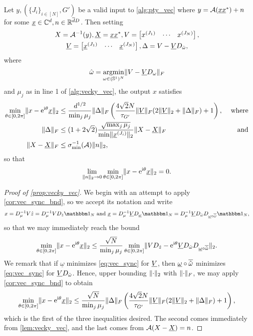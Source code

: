 \begin{proposition} \label{prop:vecky_vec}
  Let $y, (\{J_i\}_{i \in [N]}, G')$ be a valid input to \cref{alg:pty_vec} where $y = \mathcal{A}(\underline{x} \underline{x}^*) + n$ for some $\underline{x} \in \mathbb{C}^d, n \in \mathbb{R}^{\overline{d} D}$.  Then setting \[\begin{gathered}X = \mathcal{A}^{-1}(y), \underline{X} = \underline{x} \underline{x}^*, V = \begin{bmatrix} x^{(J_1)} & \cdots & x^{(J_N)} \end{bmatrix}, \\ \underline{V} = \begin{bmatrix} \underline{x}^{(J_1)} & \cdots & \underline{x}^{(J_N)} \end{bmatrix}, \Delta = V - \underline{V} D_{\hat{\omega}},\end{gathered}\] where \[\hat{\omega} = \operatorname*{argmin}_{\omega \in (\mathbb{S}^1)^N} \lVert V - \underline{V} D_\omega\rVert_F\] and $\mu_j$ as in line 1 of \cref{alg:vecky_vec}, the output $x$ satisfies \[\begin{aligned}\min_{\theta \in [0, 2\pi]} \lVert x - \mathrm{e}^{\mathrm{i} \theta} \underline{x}\rVert_2 &\le \frac{d^{1/2}}{\min_j \mu_j}\lVert\Delta\rVert_F\left(\frac{4 \sqrt{2} N}{\tau_{G'}} \lVert\underline{V}\rVert_F(2 \lVert\underline{V}\rVert_2 + \lVert\Delta\rVert_F) + 1\right), \ &\text{where} \\ \lVert\Delta\rVert_F &\le (1 + 2 \sqrt{2}) \frac{\sqrt{\max_j \mu_j}}{\min \lVert\underline{x}^{(J_i)}\rVert_2} \lVert X - \underline{X}\rVert_F \ &\text{and} \\ \lVert X - \underline{X}\rVert_F &\le \sigma_{\min}^{-1}(\mathcal{A}) \lVert n\rVert_2, \end{aligned}\] so that \[\lim_{\lVert n\rVert_2 \to 0} \min_{\theta \in [0, 2\pi]} \lVert x - \mathrm{e}^{\mathrm{i} \theta}\underline{x}\rVert_2 = 0.\]
\end{proposition}

\begin{proof}[Proof of \cref{prop:vecky_vec}]
  We begin with an attempt to apply \cref{cor:vec_sync_bnd}, so we accept its notation and write \[x = D_\mu^{-1} V \hz = D_\mu^{-1} V D_{\hz} \one_N \ \text{and} \ \ux = D_\mu^{-1} \uV D_{\underline{\omega}} \one_N = D_\mu^{-1} \uV D_{\hat{\omega}} D_{\underline{\omega} \circ \conj{\hat{\omega}}} \one_N,\] so that we may immediately reach the bound \[\min_{\theta \in [0, 2\pi]} \lVert x - \mathrm{e}^{\mathrm{i} \theta} \underline{x}\rVert_2 \le \frac{\sqrt{N}}{\min_j \mu_j} \min_{\theta \in [0, 2\pi]} \lVert V D_{\hat{z}} - \mathrm{e}^{\mathrm{i} \theta} \underline{V} D_{\hat{\omega}} D_{\underline{\omega} \circ \overline{\hat{\omega}}}\rVert_2.\]  We remark that if $\underline{\omega}$ minimizes \eqref{eq:vec_sync} for $\underline{V}$, then $\underline{\omega} \circ \overline{\hat{\omega}}$ minimizes \eqref{eq:vec_sync} for $\underline{V} D_{\hat{\omega}}$.  Hence, upper bounding $\lVert\cdot\rVert_2$ with $\lVert\cdot\rVert_F$, we may apply \cref{cor:vec_sync_bnd} to obtain \[\min_{\theta \in [0, 2\pi]} \lVert x - \mathrm{e}^{\mathrm{i} \theta} \underline{x}\rVert_2 \le \frac{\sqrt{N}}{\min_j \mu_j} \lVert\Delta\rVert_F \left(\frac{4 \sqrt{2} N}{\tau_{G'}} \lVert\underline{V}\rVert_F(2 \lVert\underline{V}\rVert_2 + \lVert\Delta\rVert_F) + 1\right),\] which is the first of the three inequalities desired.  The second comes immediately from \cref{lem:vecky_vec}, and the last comes from $\mathcal{A}(X - \underline{X}) = n$.
\end{proof}

